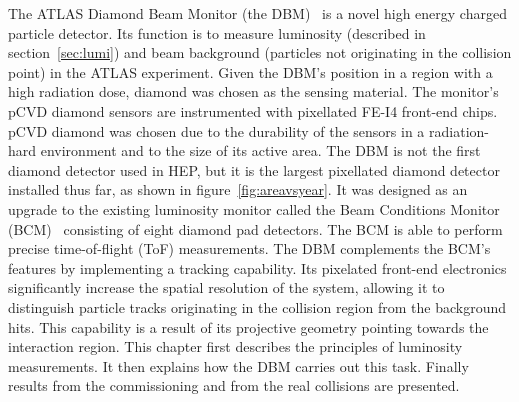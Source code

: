 The ATLAS Diamond Beam Monitor (the DBM)~\cite{Cerv:1630832} is a novel high energy charged particle detector. Its function is to measure luminosity (described in section~\ref{sec:lumi}) and beam background (particles not originating in the collision point) in the ATLAS experiment. Given the DBM's position in a region with a high radiation dose, diamond was chosen as the sensing material. The monitor's pCVD diamond sensors are instrumented with pixellated FE-I4 front-end chips. pCVD diamond was chosen due to the durability of the sensors in a radiation-hard environment and to the size of its active area. The DBM is not the first diamond detector used in HEP, but it is the largest pixellated diamond detector installed thus far, as shown in figure~\ref{fig:areavsyear}. It was designed as an upgrade to the existing luminosity monitor called the Beam Conditions Monitor (BCM)~\cite{Gorisek:1062633} consisting of eight diamond pad detectors. The BCM is able to perform precise time-of-flight (ToF) measurements. The DBM complements the BCM's features by implementing a tracking capability. Its pixelated front-end electronics significantly increase the spatial resolution of the system, allowing it to distinguish particle tracks originating in the collision region from the background hits. This capability is a result of its projective geometry pointing towards the interaction region. This chapter first describes the principles of luminosity measurements. It then explains how the DBM carries out this task. Finally results from the commissioning and from the real collisions are presented. 



